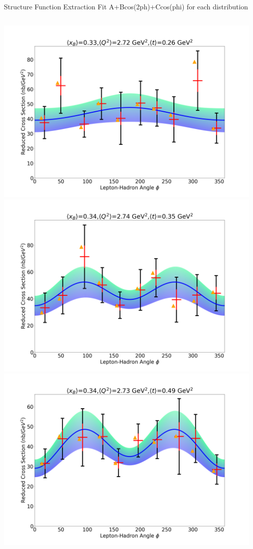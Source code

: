 \documentclass[aspectratio=169]{beamer}
\begin{document}
\begin{frame}{Structure Function Extraction}
\vspace{-0.2cm}
Fit A+Bcos(2ph)+Ccos(phi) for each distribution
\vspace{0.2cm}
\begin{columns}
            \includegraphics[width=0.99\textwidth]{defense/phi_fitting/xqt_302520.png}
            \includegraphics[width=0.99\textwidth]{defense/phi_fitting/xqt_302530.png}
            \includegraphics[width=0.99\textwidth]{defense/phi_fitting/xqt_302540.png}

\end{columns}
\end{frame}
\end{document}
